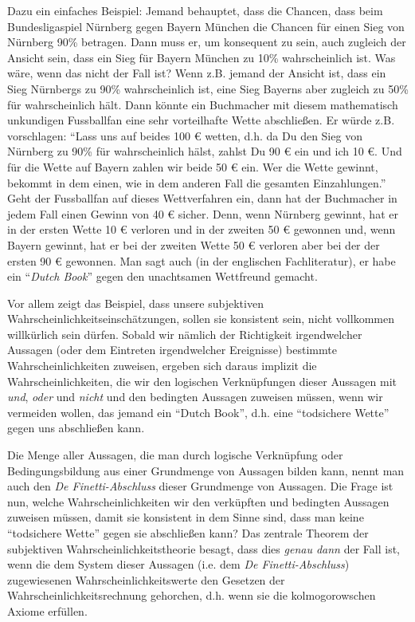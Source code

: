 Dazu ein einfaches Beispiel: Jemand behauptet, dass die Chancen,
dass beim Bundesligaspiel Nürnberg gegen Bayern München die Chancen für einen
Sieg von Nürnberg 90\% betragen. Dann muss er, um konsequent zu sein, auch
zugleich der Ansicht sein, dass ein Sieg für Bayern München zu 10\%
wahrscheinlich ist. Was wäre, wenn das nicht der Fall ist? Wenn z.B. jemand der
Ansicht ist, dass ein Sieg Nürnbergs zu 90\% wahrscheinlich ist, eine
Sieg Bayerns aber zugleich zu 50\% für wahrscheinlich hält. Dann könnte ein
Buchmacher mit diesem mathematisch unkundigen Fussballfan eine sehr vorteilhafte
Wette abschließen. Er würde z.B. vorschlagen: "`Lass uns auf beides 100 € wetten,
d.h. da Du den Sieg von Nürnberg zu 90\% für wahrscheinlich hälst, zahlst Du 90
€ ein und ich 10 €. Und für die Wette auf Bayern zahlen wir beide 50 € ein. Wer
die Wette gewinnt, bekommt in dem einen, wie in dem anderen Fall die gesamten
Einzahlungen."' Geht der Fussballfan auf dieses Wettverfahren ein, dann hat der
Buchmacher in jedem Fall einen Gewinn von 40 € sicher. Denn, wenn Nürnberg
gewinnt, hat er in der ersten Wette 10 € verloren und in der zweiten 50 €
gewonnen und, wenn Bayern gewinnt, hat er bei der zweiten Wette 50 € verloren
aber bei der der ersten 90 € gewonnen. Man sagt auch (in der
englischen Fachliteratur), er habe ein "`{\em Dutch Book}"' gegen den
unachtsamen Wettfreund gemacht.

Vor allem zeigt das Beispiel, dass unsere subjektiven
Wahrscheinlichkeitseinschätzungen, sollen sie konsistent sein, nicht vollkommen
willkürlich sein dürfen. Sobald wir nämlich der Richtigkeit
irgendwelcher Aussagen (oder dem Eintreten irgendwelcher Ereignisse) bestimmte
Wahrscheinlichkeiten zuweisen, ergeben sich daraus implizit die
Wahrscheinlichkeiten, die wir den logischen Verknüpfungen dieser Aussagen
mit {\em und}, {\em oder} und {\em nicht} und den bedingten
Aussagen zuweisen müssen, wenn wir vermeiden wollen, das jemand ein "`Dutch
Book"', d.h. eine "`todsichere Wette"' gegen uns abschließen kann.

Die Menge aller Aussagen, die man durch logische Verknüpfung oder
Bedingungsbildung aus einer Grundmenge von Aussagen bilden kann, nennt man auch
den {\em De Finetti-Abschluss}\label{DeFinettiAbschluss} dieser Grundmenge von
Aussagen. Die Frage ist nun, welche Wahrscheinlichkeiten wir den verküpften und
bedingten Aussagen zuweisen müssen, damit sie konsistent in dem Sinne sind, dass
man keine "`todsichere Wette"' gegen sie abschließen kann? Das zentrale Theorem der
subjektiven Wahrscheinlichkeitstheorie besagt, dass dies {\em genau dann} der
Fall ist, wenn die dem System dieser Aussagen (i.e. dem {\em De
Finetti-Abschluss}) zugewiesenen Wahrscheinlichkeitswerte den Gesetzen der
Wahrscheinlichkeitsrechnung gehorchen, d.h. wenn sie die kolmogorowschen Axiome
erfüllen. 

